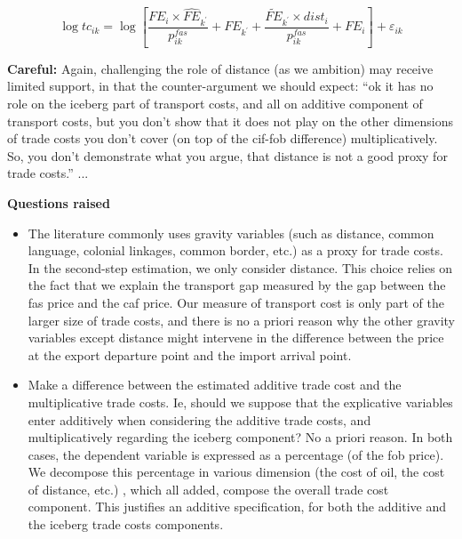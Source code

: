 \documentclass[a4paper,11pt]{article}
\begin{document}
\begin{equation}
\log tc_{ik} = \log\left[\frac{FE_i\times\widehat{FE}_{k^\prime}}{p^{fas}_{ik}} + FE_{k^\prime}+ \frac{\widetilde{FE}_{k^\prime}\times dist_i}{p_{ik}^{fas}} + FE_i\right]+ \varepsilon_{ik} \label{eq:estim1}
\end{equation}



\textbf{Careful:} Again, challenging the role of distance (as we ambition) may receive limited support, in that the counter-argument we should expect: ``ok it has no role on the iceberg part of transport costs, and all on additive component of transport costs, but you don't show that it does not play on the other dimensions of trade costs you don't cover (on top of the cif-fob difference) multiplicatively. So, you don't demonstrate what you argue, that distance is not a good proxy for trade costs.'' ... \bigskip



\textbf{Questions raised} \medskip
\begin{itemize}
\item The literature commonly uses gravity variables (such as distance, common language, colonial linkages, common border, etc.) as a proxy for trade costs. In the second-step estimation, we only consider distance. This choice relies on the fact that we explain the transport gap measured by the gap between the fas price and the caf price. Our measure of transport cost is only part of the larger size of trade costs, and there is no a priori reason why the other gravity variables except distance might intervene in the difference between the price at the export departure point and the import arrival point.

\item Make a difference between the estimated additive trade cost and the multiplicative trade costs. Ie, should we suppose that the explicative variables enter additively when considering the additive trade costs, and multiplicatively regarding the iceberg component? No a priori reason. In both cases, the dependent variable is expressed as a percentage (of the fob price). We decompose this percentage in various dimension (the cost of oil, the cost of distance, etc.) , which all added, compose the overall trade cost component. This justifies an additive specification, for both the additive and the iceberg trade costs components.


\end{itemize}
\end{document}
